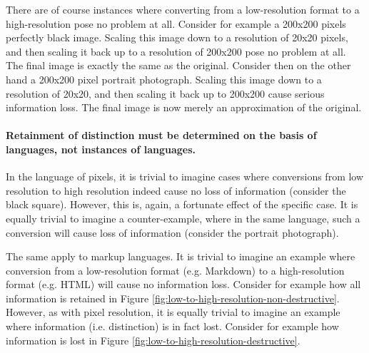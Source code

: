 \documentclass{scrreprt}
\begin{document}
There are of course instances where converting from a low-resolution format to a high-resolution pose no problem at all. Consider for example a 200x200 pixels perfectly black image. Scaling this image down to a resolution of 20x20 pixels, and then scaling it back up to a resolution of 200x200 pose no problem at all. The final image is exactly the same as the original. Consider then on the other hand a 200x200 pixel portrait photograph. Scaling this image down to a resolution of 20x20, and then scaling it back up to 200x200 cause serious information loss. The final image is now merely an approximation of the original.

\paragraph{Retainment of distinction must be determined on the basis of languages, not instances of languages.} In the language of pixels, it is trivial to imagine cases where conversions from low resolution to high resolution indeed cause no loss of information (consider the black square). However, this is, again, a fortunate effect of the specific case. It is equally trivial to imagine a counter-example, where in the same language, such a conversion will cause loss of information (consider the portrait photograph).

The same apply to markup languages. It is trivial to imagine an example where conversion from a low-resolution format (e.g. Markdown) to a high-resolution format (e.g. HTML) will cause no information loss. Consider for example how all information is retained in Figure \ref{fig:low-to-high-resolution-non-destructive}. However, as with pixel resolution, it is equally trivial to imagine an example where information (i.e. distinction) is in fact lost. Consider for example how information is lost in Figure \ref{fig:low-to-high-resolution-destructive}.
\end{document}
